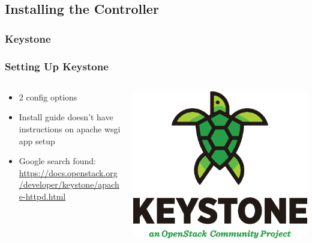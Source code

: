 \documentclass[aspectratio=169,11pt,hyperref={colorlinks=true}]{beamer}
\begin{document}
\subsection{Installing the Controller}
\subsubsection{Keystone}
\begin{frame}
    \frametitle{Setting Up Keystone}
    \begin{columns}[T]
        \begin{column}{.48\textwidth}
            \begin{itemize}
                \item 2 config options
                \item Install guide doesn't have instructions on
                    apache wsgi app setup
                \item Google search found: \href{https://docs.openstack.org/developer/keystone/apache-httpd.html}{https://docs.openstack.org/developer/keystone/apache-httpd.html}
            \end{itemize}
        \end{column}
        \begin{column}{.48\textwidth}
            \includegraphics[width=\textwidth]{mascots/keystone.eps}
        \end{column}
    \end{columns}
\end{frame}
\end{document}
